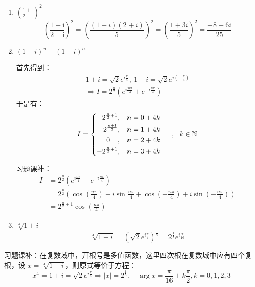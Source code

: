 \documentclass[UTF8]{report}
\def\N{\mathbb{N}}
\theoremstyle{MyLineTheoremStyle} %
\theoremstyle{MyBlockTheoremStyle} %
\theoremstyle{MySubsubsectionStyle} %
\begin{document}
\begin{enumerate}
\item $(\frac{1+ \mathrm{i} }{2- \mathrm{i} })^2$
\begin{equation*}
    \left(\frac{1+ \mathrm{i} }{2- \mathrm{i} }\right)^2 
    = \left(\frac{(1+i)(2+i)}{5}\right)^2
    = \left(\frac{1+3i}{5}\right)^2 = \frac{-8 + 6i}{25}
\end{equation*}

\item $(1+i)^n + (1-i)^n$

首先得到：
\begin{gather*}
    1+i = \sqrt{2}e^{i\frac{\pi}{4}},\ 1-i = \sqrt{2}e^{i(-\frac{\pi}{4})}\\ \Longrightarrow
    I = 2^{\frac{n}{2}}\left( e^{i\frac{n\pi}{4}} + e^{-i\frac{n\pi}{4}} \right)
\end{gather*}
于是有：
\begin{equation*}
I = 
\begin{cases}
\begin{aligned}
    2^{\frac{n}{2}+1} &, && n = 0 + 4k \\
    2^{\frac{n+1}{2}} &, && n = 1 + 4k \\
    0  \hspace{0.4cm} &, && n = 2 + 4k \\
    -2^{\frac{n}{2}+1}&, && n = 3 + 4k \\
\end{aligned}
\end{cases}\ ,\ \ k \in \N
\end{equation*}
{\par\color{gray}\small
习题课补：
\begin{align*}
I &= 
2^{\frac{n}{2}}\left( e^{i\frac{n\pi}{4}} + e^{-i\frac{n\pi}{4}} \right)  \\ 
&= 2^{\frac{n}{2}}  \left( \cos(\frac{n\pi}{4}) +i\sin\frac{n\pi}{4} +  \cos(-\frac{n\pi}{4}) +i\sin(-\frac{n\pi}{4}) \right)  \\ 
&= 2^{\frac{n}{2}+1} \cos(\frac{n\pi}{4})
\end{align*}
\par}


\item $\sqrt[4]{1+i}$
\begin{equation*}
    \sqrt[4]{1+i} = \left(\sqrt{2}e^{i\frac{\pi}{4}}\right)^{\frac{1}{4}} = 2^{\frac{1}{8}}e^{i\frac{\pi}{16}}  
\end{equation*}
\end{enumerate}
{\par\color{gray}\small
习题课补：在复数域中，开根号是多值函数，这里四次根在复数域中应有四个复根，设 $x = \sqrt[4]{1+i}$，则原式等价于方程：
\begin{equation*}
x^4 = 1+i = \sqrt{2}e^{i\frac{\pi}{4}} \Longrightarrow | x | = 2^{\frac{1}{8}},\quad \arg x = \frac{\pi}{16} + k\frac{\pi}{2}, k = 0,1,2,3 
\end{equation*}
\par}
\end{document}
